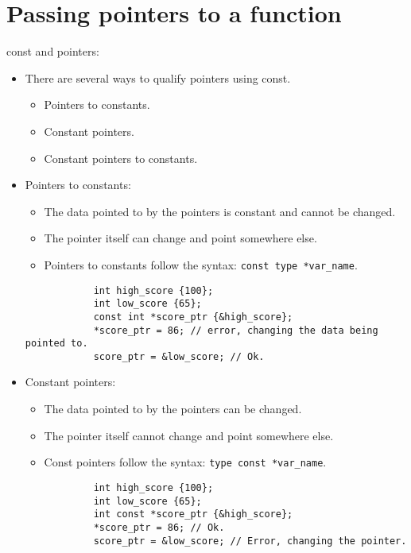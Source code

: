 \section{Passing pointers to a function}
const and pointers:
\begin{itemize}
    \item There are several ways to qualify pointers using const.
        \begin{itemize}
            \item Pointers to constants.
            \item Constant pointers.
            \item Constant pointers to constants.
        \end{itemize}
    
    \item Pointers to constants:
        \begin{itemize}
            \item The data pointed to by the pointers is constant and cannot be changed.
            \item The pointer itself can change and point somewhere else.
            \item Pointers to constants follow the syntax: \verb|const type *var_name|.
        \end{itemize}
        \begin{verbatim}
            int high_score {100};
            int low_score {65};
            const int *score_ptr {&high_score};
            *score_ptr = 86; // error, changing the data being pointed to.
            score_ptr = &low_score; // Ok.
        \end{verbatim}
    
    \item Constant pointers:
        \begin{itemize}
            \item The data pointed to by the pointers can be changed.
            \item The pointer itself cannot change and point somewhere else.
            \item Const pointers follow the syntax: \verb|type const *var_name|.
        \end{itemize}
        \begin{verbatim}
            int high_score {100};
            int low_score {65};
            int const *score_ptr {&high_score};
            *score_ptr = 86; // Ok.
            score_ptr = &low_score; // Error, changing the pointer.
        \end{verbatim}
\end{itemize}


